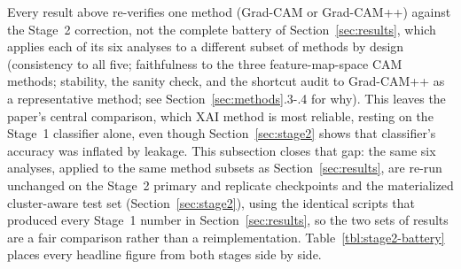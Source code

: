 Every result above re-verifies one method (Grad-CAM or Grad-CAM++) against the Stage~2 correction, not the complete battery of Section~\ref{sec:results}, which applies each of its six analyses to a different subset of methods by design (consistency to all five; faithfulness to the three feature-map-space CAM methods; stability, the sanity check, and the shortcut audit to Grad-CAM++ as a representative method; see Section~\ref{sec:methods}.3-.4 for why). This leaves the paper's central comparison, which XAI method is most reliable, resting on the Stage~1 classifier alone, even though Section~\ref{sec:stage2} shows that classifier's accuracy was inflated by leakage. This subsection closes that gap: the same six analyses, applied to the same method subsets as Section~\ref{sec:results}, are re-run unchanged on the Stage~2 primary and replicate checkpoints and the materialized cluster-aware test set (Section~\ref{sec:stage2}), using the identical scripts that produced every Stage~1 number in Section~\ref{sec:results}, so the two sets of results are a fair comparison rather than a reimplementation. Table~\ref{tbl:stage2-battery} places every headline figure from both stages side by side.

